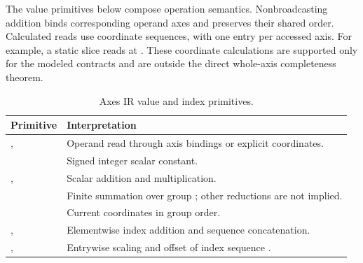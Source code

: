 \label{app:value-index-expressions}
The value primitives below compose operation semantics. Nonbroadcasting
addition binds corresponding operand axes and preserves their shared
order. Calculated reads use coordinate sequences, with one entry per
accessed axis. For example, a static slice reads at
. These coordinate calculations
are supported only for the modeled contracts and are outside the direct
whole-axis completeness theorem.
\begin{table}[!htbp]
\caption{Axes IR value and index primitives.}
\label{tab:axes-ir-value-index-primitives}
\small
\begin{tabularx}{\linewidth}{@{}lY@{}}\toprule
Primitive & Interpretation\\\midrule
{},  & Operand read through axis bindings or explicit coordinates.\\
 & Signed integer scalar constant.\\
,  & Scalar addition and multiplication.\\
 & Finite summation over group ; other reductions are not implied.\\
 & Current coordinates in group order.\\
,  & Elementwise index addition and sequence concatenation.\\
,  & Entrywise scaling and offset of index sequence .\\\bottomrule
\end{tabularx}
\end{table}

